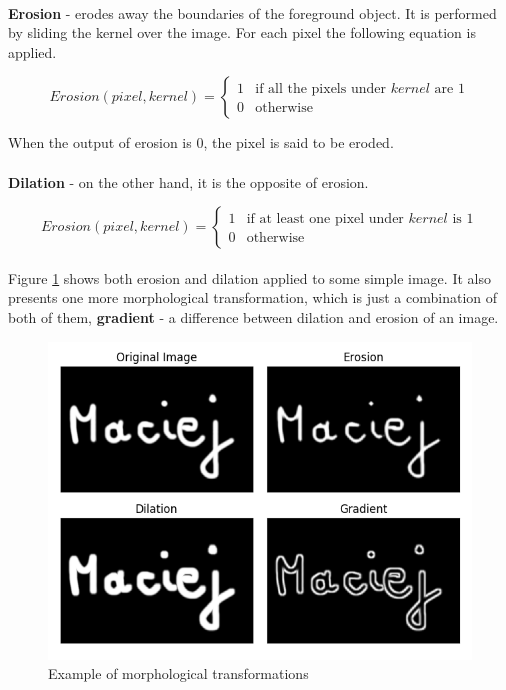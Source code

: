 \paragraph{}
\textbf{Erosion} - erodes away the boundaries of the foreground object. It is performed by sliding the kernel over the image. For each pixel the following equation is applied.

\begin{equation}
	Erosion(pixel, kernel) = \begin{cases}
		1 & \text{if all the pixels under $kernel$ are 1}\\
		0 & \text{otherwise}
	\end{cases}
\end{equation}

When the output of erosion is 0, the pixel is said to be eroded.

\paragraph{}
\textbf{Dilation} - on the other hand, it is the opposite of erosion. 

\begin{equation}
	Erosion(pixel, kernel) = \begin{cases}
		1 & \text{if at least one pixel under $kernel$ is 1}\\
		0 & \text{otherwise}
	\end{cases}
\end{equation}

\paragraph{}
Figure \ref{fig:morphological_examples} shows both erosion and dilation applied to some simple image. It also presents one more morphological transformation, which is just a combination of both of them, \textbf{gradient} - a difference between dilation and erosion of an image.

\begin{figure}[H]
	\centering
	\includegraphics[width=\textwidth]{images/morphological}
	\caption{Example of morphological transformations}
	\label{fig:morphological_examples}
\end{figure}

